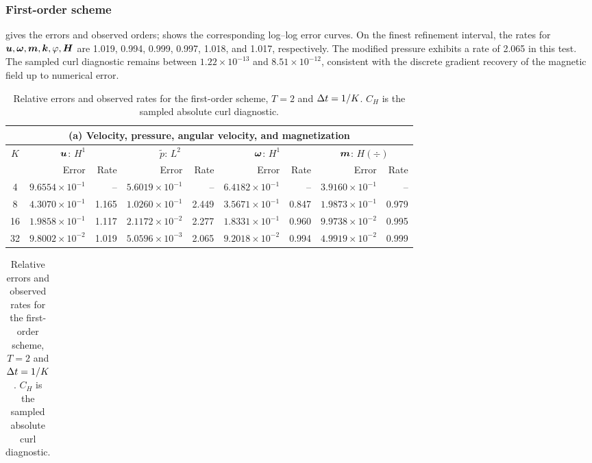 \subsubsection{First-order scheme}
\label{subsec:revised-numerical-first}
 gives the errors and observed orders;
 shows the corresponding
log--log error curves. On the finest refinement interval, the rates
for $\boldsymbol u,\boldsymbol\omega,\boldsymbol m,\boldsymbol k,\varphi,\boldsymbol H$ are
1.019, 0.994, 0.999, 0.997, 1.018, and 1.017, respectively.
The modified pressure exhibits a rate of 2.065 in this test.
The sampled curl diagnostic remains between $1.22\times10^{-13}$
and $8.51\times10^{-12}$, consistent with the discrete gradient
recovery of the magnetic field up to numerical error.

\begin{table}[htbp]
\centering
\caption{Relative errors and observed rates for the first-order scheme, $T=2$ and $\Delta t=1/K$. $C_H$ is the sampled absolute curl diagnostic.}
\label{tab:first-order-errors}
\begingroup
\small
\setlength{\tabcolsep}{3.5pt}
\renewcommand{\arraystretch}{1.15}
\begin{tabular}{crrrrrrrr}
\toprule
\multicolumn{9}{c}{(a) Velocity, pressure, angular velocity, and magnetization}\\
\midrule
$K$ & \multicolumn{2}{c}{$\boldsymbol u$: $H^1$} & \multicolumn{2}{c}{$\widetilde p$: $L^2$} & \multicolumn{2}{c}{$\boldsymbol\omega$: $H^1$} & \multicolumn{2}{c}{$\boldsymbol m$: $H(\div)$}\\
 & Error & Rate & Error & Rate & Error & Rate & Error & Rate\\
\midrule
4 & $9.6554\!\times\!10^{-1}$ & -- & $5.6019\!\times\!10^{-1}$ & -- & $6.4182\!\times\!10^{-1}$ & -- & $3.9160\!\times\!10^{-1}$ & --\\
8 & $4.3070\!\times\!10^{-1}$ & 1.165 & $1.0260\!\times\!10^{-1}$ & 2.449 & $3.5671\!\times\!10^{-1}$ & 0.847 & $1.9873\!\times\!10^{-1}$ & 0.979\\
16 & $1.9858\!\times\!10^{-1}$ & 1.117 & $2.1172\!\times\!10^{-2}$ & 2.277 & $1.8331\!\times\!10^{-1}$ & 0.960 & $9.9738\!\times\!10^{-2}$ & 0.995\\
32 & $9.8002\!\times\!10^{-2}$ & 1.019 & $5.0596\!\times\!10^{-3}$ & 2.065 & $9.2018\!\times\!10^{-2}$ & 0.994 & $4.9919\!\times\!10^{-2}$ & 0.999\\
\bottomrule
\end{tabular}
\par\medskip
\begin{tabular}{crrrrrrr}

\end{tabular}
\end{table}
